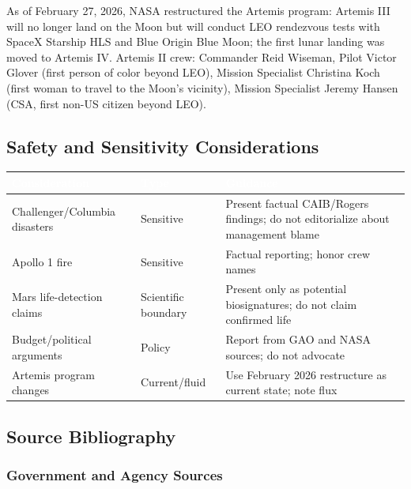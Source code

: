 \documentclass[11pt,letterpaper]{article}
\newcommand{\tableheader}[1]{\textbf{\sffamily\textcolor{white}{#1}}}
\begin{document}
As of February 27, 2026, NASA restructured the Artemis program: Artemis III will no longer land on the Moon but will conduct LEO rendezvous tests with SpaceX Starship HLS and Blue Origin Blue Moon; the first lunar landing was moved to Artemis IV. Artemis II crew: Commander Reid Wiseman, Pilot Victor Glover (first person of color beyond LEO), Mission Specialist Christina Koch (first woman to travel to the Moon's vicinity), Mission Specialist Jeremy Hansen (CSA, first non-US citizen beyond LEO).

\subsection{Safety and Sensitivity Considerations}

\begin{center}
\begin{tabularx}{\textwidth}{L{3.5cm}L{2cm}X}
\toprule
{}
\tableheader{Consideration} & \tableheader{Type} & \tableheader{Guidance} \\
\midrule
Challenger/Columbia disasters & Sensitive & Present factual CAIB/Rogers findings; do not editorialize about management blame \\
Apollo 1 fire & Sensitive & Factual reporting; honor crew names \\
Mars life-detection claims & Scientific boundary & Present only as potential biosignatures; do not claim confirmed life \\
Budget/political arguments & Policy & Report from GAO and NASA sources; do not advocate \\
Artemis program changes & Current/fluid & Use February 2026 restructure as current state; note flux \\
\bottomrule
\end{tabularx}
\end{center}

\subsection{Source Bibliography}

\subsubsection{Government and Agency Sources}
\end{document}
